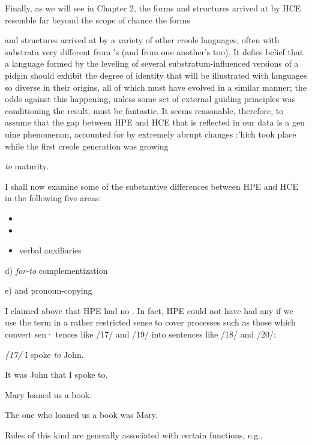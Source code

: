 Finally, as we will see in Chapter 2, the forms and structures arrived at by HCE resemble far beyond the scope of chance the forms



and structures arrived at by a variety of other creole languages, often with substrata very different from 's (and from one another's too). It defies belief that a language formed by the leveling of several substratum-influenced versions of a pidgin should exhibit the degree of identity that will be illustrated with languages so diverse in their origins, all of which must have evolved in a similar manner; the odds against this happening, unless some set of external guiding principles was condi\-tioning the result, must be fantastic. It seems reasonable, therefore, to assume that the gap between HPE and HCE that is reflected in our data is a gen uine phenomenon, accounted for by extremely abrupt changes :'hich took place while the first creole generation was growing

\textit{to} maturity.

I shall now examine some of the substantive differences between HPE and HCE in the following five areas:


\begin{itemize}
\item {}
\item {}
\item verbal auxiliaries
\end{itemize}

d) \textit{for-to }complementization

e)  and pronoun-copying

I claimed above that HPE had no . In fact, HPE could not have had any  if we use the term in a rather restricted sense to cover processes such as those which convert sen· tences like /17/ and /19/ into sentences like /18/ and /20/:

\textit{\{17}\textit{/ }I spoke \textit{to} John.

\ea\label{ex:18}
 It was John that I spoke to.
\glt
\z

\ea\label{ex:19}
 Mary loaned us a book.
\glt
\z

\ea\label{ex:20}
 The one who loaned us a book was Mary.
\glt
\z

Rules of this kind are generally associated with certain functions, e.g.,

